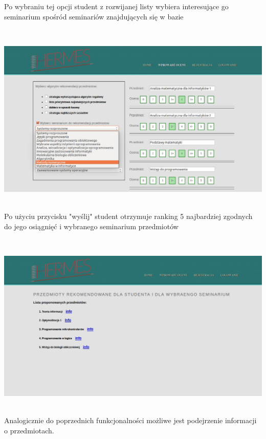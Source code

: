 \documentclass[licencjacka]{pracamgr}
\begin{document}
Po wybraniu tej opcji student z rozwijanej listy wybiera interesujące go seminarium spośród seminariów znajdujących się w bazie \par
~\\
\begin{minipage}{\linewidth}
	\centering
           \includegraphics[scale=0.5]{rekPrzedmSemSelect.jpg}
\end{minipage} \\

Po użyciu przycisku "wyślij" student otrzymuje ranking 5 najbardziej zgodnych do jego osiągnięć i wybranego seminarium przedmiotów \par
~\\
\begin{minipage}{\linewidth}
	\centering
           \includegraphics[scale=0.5]{rekPrzedmSemResult.jpg}
\end{minipage} \\

Analogicznie do poprzednich funkcjonalności możliwe jest podejrzenie informacji o przedmiotach.
\end{document}
